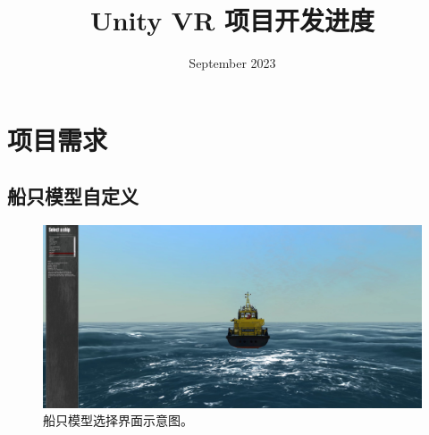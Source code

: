 \documentclass[a4paper,10pt]{article}
\begin{document}
	
	
	\title{\songti {}Unity VR 项目开发进度}
	\date{\textrm{September 2023}}
	\maketitle
	
	\renewcommand{\figurename}{Figure} %
	\renewcommand{\contentsname}{Contents}
	\renewcommand{\tablename}{Table}
	\tableofcontents  %
	

	\section{项目需求}
	
		\subsection{船只模型自定义}
		
		\begin{figure}[htbp]
			\centering				
			\includegraphics[width=0.7\columnwidth]{picture/Select a ship}
			\caption{
				\label{fig: Select a ship} 
				船只模型选择界面示意图。
			}	
		\end{figure}
		
\end{document}
